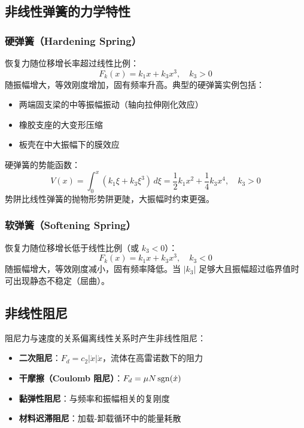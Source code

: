 \subsection{非线性弹簧的力学特性}
\subsubsection{硬弹簧（Hardening Spring）}
恢复力随位移增长率超过线性比例：
\[
F_k(x) = k_1 x + k_3 x^{3}, \quad k_3 > 0
\]
随振幅增大，等效刚度增加，固有频率升高。典型的硬弹簧实例包括：
\begin{itemize}
    \item 两端固支梁的中等振幅振动（轴向拉伸刚化效应）
    \item 橡胶支座的大变形压缩
    \item 板壳在中大振幅下的膜效应
\end{itemize}

\begin{myformula}
硬弹簧的势能函数：
\[
V(x) = \int_0^{x} (k_1 \xi + k_3 \xi^{3})\,d\xi = \frac{1}{2}k_1 x^{2} + \frac{1}{4}k_3 x^{4}, \quad k_3 > 0
\]
势阱比线性弹簧的抛物形势阱更陡，大振幅时约束更强。
\end{myformula}

\subsubsection{软弹簧（Softening Spring）}
恢复力随位移增长低于线性比例（或 $k_3 < 0$）：
\[
F_k(x) = k_1 x + k_3 x^{3}, \quad k_3 < 0
\]
随振幅增大，等效刚度减小，固有频率降低。当 $|k_3|$ 足够大且振幅超过临界值时可出现静态不稳定（屈曲）。

\subsection{非线性阻尼}
阻尼力与速度的关系偏离线性关系时产生非线性阻尼：
\begin{itemize}
    \item \textbf{二次阻尼}：$F_d = c_2 |\dot{x}|\dot{x}$，流体在高雷诺数下的阻力
    \item \textbf{干摩擦（Coulomb 阻尼）}：$F_d = \mu N \operatorname{sgn}(\dot{x})$
    \item \textbf{黏弹性阻尼}：与频率和振幅相关的复刚度
    \item \textbf{材料迟滞阻尼}：加载-卸载循环中的能量耗散
\end{itemize}

